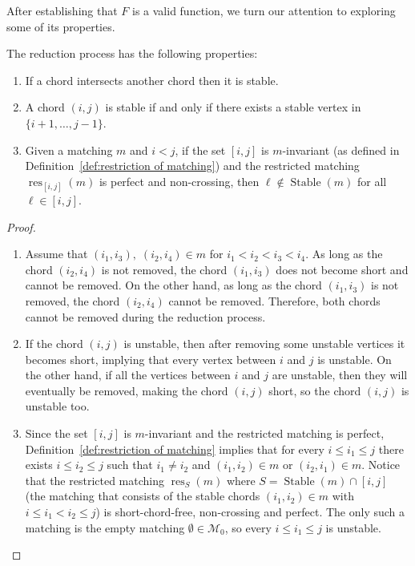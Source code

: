 \documentclass[ALCO]{cedram}
\newcommand{\Stable}{\operatorname{Stable}}
\newcommand{\res}{\operatorname{res}}
\newcommand{\M}{\mathcal{M}}
\begin{document}
After establishing that $F$ is a valid function, we turn our attention to exploring some of its properties.

\begin{lemma}
\label{lem:properties of core}
    The reduction process has the following properties:
    \begin{enumerate}[label=(\arabic*), ref=\ref{lem:properties of core}\text{ (part~}\arabic*)]
        \item \label{lem:properties of core--intersect stable} If a chord intersects another chord then it is stable.
        \item \label{lem:properties of core--chord unstable iff all midpoints unstable} A chord $(i,j)$ is stable if and only if there exists a stable vertex in $\{i+1,\dots,j-1\}$.
        \item \label{lem:properties of core--perfect non-crossing unstable} Given a matching $m$ and $i < j$, if the set $[i,j]$ is $m$-invariant \textup{(}as defined in Definition~\ref{def:restriction of matching}\textup{)} and the restricted matching $\res_{[i,j]}(m)$ is perfect and non-crossing, then $\ell \notin \Stable(m)$ for all $\ell \in [i,j]$.
    \end{enumerate}
\end{lemma}

\begin{proof} \hfill %
    \begin{enumerate}
        \item Assume that $(i_1,i_3),\; (i_2,i_4) \in m$ for $i_1 < i_2 < i_3 < i_4$. As long as the chord $(i_2,i_4)$ is not removed, the chord $(i_1,i_3)$ does not become short and cannot be removed. On the other hand, as long as the chord $(i_1,i_3)$ is not removed, the chord $(i_2,i_4)$ cannot be removed. Therefore, both chords cannot be removed during the reduction process.
        \item If the chord $(i,j)$ is unstable, then after removing some unstable vertices it becomes short, implying that every vertex between $i$ and $j$ is unstable. On the other hand, 
        if all the vertices between $i$ and $j$ are unstable, then they will eventually be removed, making the chord $(i,j)$ short, so the chord $(i,j)$ is unstable too.
        \item %
        Since the set $[i,j]$ is $m$-invariant and the restricted matching is perfect, Definition~\ref{def:restriction of matching} implies that for every $i \le i_1 \le j$ there exists $i \le i_2 \le j$ such that $i_1 \ne i_2$ and $(i_1,i_2) \in m$ or $(i_2,i_1) \in m$.
        Notice that the restricted matching $\res_S(m)$ where $S = \Stable(m) \cap [i,j]$ (\ie the matching that consists of the stable chords $(i_1,i_2) \in m$ with $i \le i_1<i_2 \le j$) is short-chord-free, non-crossing and perfect. The only such a matching is the empty matching $\emptyset \in \M_0$, so every $i \le i_1 \le j$ is unstable.
        \qedhere
    \end{enumerate}
\end{proof}
\end{document}
